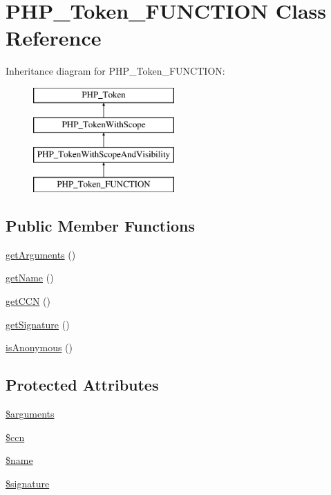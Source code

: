 \hypertarget{class_p_h_p___token___f_u_n_c_t_i_o_n}{}\section{P\+H\+P\+\_\+\+Token\+\_\+\+F\+U\+N\+C\+T\+I\+ON Class Reference}
\label{class_p_h_p___token___f_u_n_c_t_i_o_n}
Inheritance diagram for P\+H\+P\+\_\+\+Token\+\_\+\+F\+U\+N\+C\+T\+I\+ON\+:\begin{figure}[H]
\begin{center}
\leavevmode
\includegraphics[height=4.000000cm]{class_p_h_p___token___f_u_n_c_t_i_o_n}
\end{center}
\end{figure}
\subsection*{Public Member Functions}
\begin{DoxyCompactItemize}
\item 
\mbox{\hyperlink{class_p_h_p___token___f_u_n_c_t_i_o_n_a1d4c324c5a088be98d99d3efbf3502e1}{get\+Arguments}} ()
\item 
\mbox{\hyperlink{class_p_h_p___token___f_u_n_c_t_i_o_n_a3d0963e68bb313b163a73f2803c64600}{get\+Name}} ()
\item 
\mbox{\hyperlink{class_p_h_p___token___f_u_n_c_t_i_o_n_a1b5bd15251472bd2b59102bb7a7c53b6}{get\+C\+CN}} ()
\item 
\mbox{\hyperlink{class_p_h_p___token___f_u_n_c_t_i_o_n_a5e4e7535fea75a98cb5f2e1cdd2e9f34}{get\+Signature}} ()
\item 
\mbox{\hyperlink{class_p_h_p___token___f_u_n_c_t_i_o_n_a1e7b2580aa378d9676b1212e012a177f}{is\+Anonymous}} ()
\end{DoxyCompactItemize}
\subsection*{Protected Attributes}
\begin{DoxyCompactItemize}
\item 
\mbox{\hyperlink{class_p_h_p___token___f_u_n_c_t_i_o_n_a61eded163d962fc248b3cf209000979b}{\$arguments}}
\item 
\mbox{\hyperlink{class_p_h_p___token___f_u_n_c_t_i_o_n_a7f70137511a65e083e47974337681dee}{\$ccn}}
\item 
\mbox{\hyperlink{class_p_h_p___token___f_u_n_c_t_i_o_n_ab2fc40d43824ea3e1ce5d86dee0d763b}{\$name}}
\item 
\mbox{\hyperlink{class_p_h_p___token___f_u_n_c_t_i_o_n_a8f34ca1e46a621ab10a3a40addb794f5}{\$signature}}
\end{DoxyCompactItemize}



